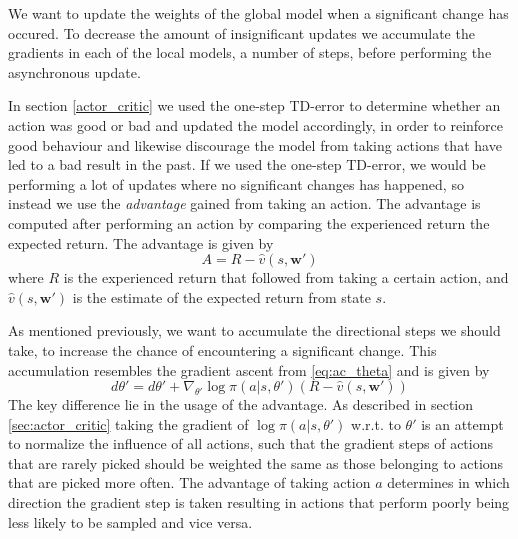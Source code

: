 \documentclass[11pt]{article}
\begin{document}
We want to update the weights of the global model
when a significant change has occured.
To decrease the amount of insignificant updates we accumulate the gradients
in each of the local models, a number of steps, before performing the asynchronous update.

In section \ref{actor_critic} we used the one-step TD-error to determine
whether an action was good or bad and updated the model accordingly, in order to 
reinforce good behaviour and likewise discourage
the model from taking actions that have led to a bad result in the past.
If we used the one-step TD-error, we would be performing
a lot of updates where no significant changes has happened, so
instead we use the \textit{advantage} gained from taking an action.
The advantage is computed after performing an action by comparing the experienced return the
expected return.
The advantage is given by
\begin{equation}
    A = R - \hat{v}(s, \mathbf{w}')
\end{equation}
where $R$ is the experienced return that followed from taking
a certain action, and $\hat{v}(s, \mathbf{w}')$ 
is the estimate of the expected return from state $s$.

As mentioned previously, we want to accumulate the directional
steps we should take, to increase the chance of encountering a significant change.
This accumulation resembles the gradient ascent from \ref{eq:ac_theta} and
is given by
\begin{equation}
    d\theta' = d\theta' + \nabla_{\theta'} \log \pi(a|s, \theta')(R - \hat{v}(s, \mathbf{w}'))
\end{equation}
The key difference lie in the usage of the advantage.
As described in section \ref{sec:actor_critic} taking the gradient of $\log \pi(a|s, \theta')$
w.r.t. to $\theta'$ is an attempt to normalize the influence of all actions, such that the
gradient steps of actions that are rarely picked should be weighted the same
as those belonging to actions that are picked more often.
The advantage of taking action $a$ determines in which direction the gradient step
is taken resulting in actions that perform poorly being less likely to be sampled
and vice versa.
\end{document}
